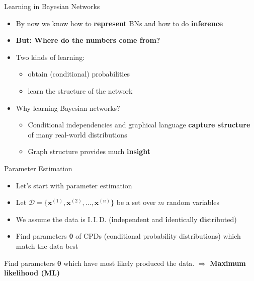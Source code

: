 \begin{frame}{Learning in Bayesian Networks}{}
	\begin{itemize}
		\item By now we know how to \textbf{represent} BNs and how to do \textbf{inference}
		\item \textbf{But: Where do the numbers come from?}
		\item Two kinds of learning:
		\begin{itemize}
			\item {} obtain (conditional) probabilities
			\item {} learn the structure of the network
		\end{itemize}
		\item Why learning Bayesian networks?
		\begin{itemize}
			\item Conditional independencies and graphical language \textbf{capture structure}
				of many real-world distributions
			\item Graph structure provides much \textbf{insight}
		\end{itemize}
	\end{itemize}
\end{frame}


\begin{frame}{Parameter Estimation}{}
	\begin{itemize}
		\item Let's start with parameter estimation
		\item Let $\mathcal{D} = \{\bm{x}^{(1)}, \bm{x}^{(2)}, \dots, \bm{x}^{(n)}\}$ be a set over
			$m$ random variables
		\item We assume the data is I.\,I.\,D.
			{\footnotesize(\textbf{i}ndependent and \textbf{i}dentically \textbf{d}istributed)}
		\item Find parameters $\bm{\theta}$ of CPDs {\footnotesize (conditional probability distributions)}
			which match the data best
	\end{itemize}

	\begin{boxBlueNoFrame}
		 Find parameters $\bm{\theta}$ which have most likely
			produced the data. $\Rightarrow$ \textbf{Maximum likelihood (ML)}
	\end{boxBlueNoFrame}
\end{frame}


